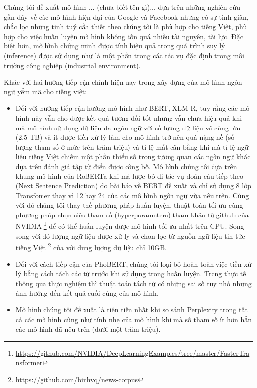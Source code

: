 \documentclass[10pt, conference, a4paper, compsocconf]{IEEEtran}
\begin{document}
Chúng tôi đề xuất mô hình ... (chưa biết tên gì)... dựa trên những nghiên cứu gần đây về các mô hình hiện đại của Google và Facebook nhưng có sự tinh giãn, 
chắc lọc những tinh tuý cần thiết theo chúng tôi là phù hợp cho tiếng Việt, phù hợp cho việc huấn luyện mô hình không tốn quá nhiều tài nguyên, tài lực.
Đặc biệt hơn, mô hình chứng minh được tính hiệu quả trong quá trình suy lý (inference) được sử dụng như là một phần trong các tác vụ đặc định trong môi trường công nghiệp (industrial environment).

Khác với hai hướng tiếp cận chính hiện nay trong xây dựng của mô hình ngôn ngữ yểm mã cho tiếng việt:
\begin{itemize}
  \item Đối với hướng tiếp cận hướng mô hình như BERT\cite{Devlin2018}, XLM-R\cite{Conneau2019}, tuy rằng các mô hình này vẫn cho được kết quả tương đối tốt nhưng vẫn chưa hiệu quả
  khi mà mô hình sử dụng dữ liệu đa ngôn ngữ với số lượng dữ liệu vô cùng lớn (2.5 TB) và ít được tiền xử lý 
  làm cho mô hình trở nên quá nặng nề (số lượng tham số ở mức trên trăm triệu) và tỉ lệ mất cân bằng khi mà tỉ lệ ngữ liệu tiếng Việt chiếm một phần thiểu số trong tương quan các ngôn ngữ khác dựa trên đánh giá tập từ điển được công bố.
  Mô hình chúng tôi dựa trên khung mô hình của RoBERTa\cite{Liu2019} khi mà lược bỏ đi tác vụ đoán câu tiếp theo (Next Sentence Prediction) do bài báo về BERT\cite{Devlin2018} đề xuất và 
  chỉ sử dụng 8 lớp Transfomer thay vì 12 hay 24 của các mô hình ngôn ngữ vừa nêu trên.
  Cùng với đó chúng tôi thay thế phương pháp huấn luyện, thuật toán tối ưu cùng phương pháp chọn siêu tham số (hyperparameters) tham khảo từ github của NVIDIA
  \footnote{\url{https://github.com/NVIDIA/DeepLearningExamples/tree/master/FasterTransformer}} 
  để có thể huấn luyện được mô hình tối ưu nhất trên GPU. 
  Song song với đó lượng ngữ liệu được xử lý và chon lọc từ nguồn ngữ liệu tin tức tiếng Việt
  \footnote{\url{https://github.com/binhvq/news-corpus}} 
  của với dung lượng dữ liệu chỉ 10GB.
  \item Đối với cách tiếp cận của PhoBERT\cite{Nguyen2020}, chúng tôi loại bỏ hoàn toàn việc tiền xử lý bằng cách tách các từ trước khi sử dụng trong huấn luyện.
  Trong thực tế thông qua thực nghiệm thì thuật toán tách từ có những sai số tuy nhỏ nhưng ảnh hưởng đến kết quả cuối cùng của mô hình. 
  \item Mô hình chúng tôi đề xuất là tiên tiến nhất khi so sánh Perplexity trong tất cả các mô hình cũng như 
   tính nhẹ của mô hình khi mà số tham số ít hơn hẳn các mô hình đã nêu trên (dưới một trăm triệu).
\end{itemize}
\end{document}
